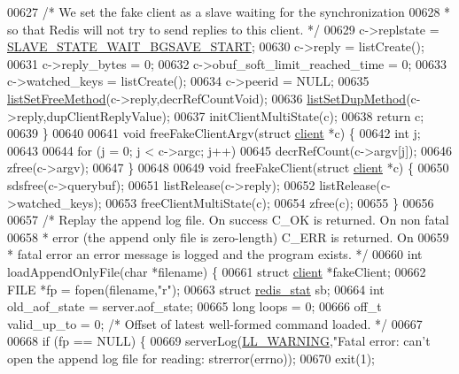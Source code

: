 \begin{DoxyCode}
{{{{{{{{{00627     \textcolor{comment}{/* We set the fake client as a slave waiting for the synchronization}
00628 \textcolor{comment}{     * so that Redis will not try to send replies to this client. */}
00629     c->replstate = \hyperlink{server_8h_a170ee2dd8cfefaf0d112edcc3152f8d7}{SLAVE\_STATE\_WAIT\_BGSAVE\_START};
00630     c->reply = listCreate();
00631     c->reply\_bytes = 0;
00632     c->obuf\_soft\_limit\_reached\_time = 0;
00633     c->watched\_keys = listCreate();
00634     c->peerid = NULL;
00635     \hyperlink{adlist_8h_a648e4a2d20decff3182a72a608b0b8f2}{listSetFreeMethod}(c->reply,decrRefCountVoid);
00636     \hyperlink{adlist_8h_ab575839d09f454c02e06bcec5addb06b}{listSetDupMethod}(c->reply,dupClientReplyValue);
00637     initClientMultiState(c);
00638     \textcolor{keywordflow}{return} c;
00639 \}
00640 
00641 \textcolor{keywordtype}{void} freeFakeClientArgv(\textcolor{keyword}{struct} \hyperlink{structclient}{client} *c) \{
00642     \textcolor{keywordtype}{int} j;
00643 
00644     \textcolor{keywordflow}{for} (j = 0; j < c->argc; j++)
00645         decrRefCount(c->argv[j]);
00646     zfree(c->argv);
00647 \}
00648 
00649 \textcolor{keywordtype}{void} freeFakeClient(\textcolor{keyword}{struct} \hyperlink{structclient}{client} *c) \{
00650     sdsfree(c->querybuf);
00651     listRelease(c->reply);
00652     listRelease(c->watched\_keys);
00653     freeClientMultiState(c);
00654     zfree(c);
00655 \}
00656 
00657 \textcolor{comment}{/* Replay the append log file. On success C\_OK is returned. On non fatal}
00658 \textcolor{comment}{ * error (the append only file is zero-length) C\_ERR is returned. On}
00659 \textcolor{comment}{ * fatal error an error message is logged and the program exists. */}
00660 \textcolor{keywordtype}{int} loadAppendOnlyFile(\textcolor{keywordtype}{char} *filename) \{
00661     \textcolor{keyword}{struct} \hyperlink{structclient}{client} *fakeClient;
00662     FILE *fp = fopen(filename,\textcolor{stringliteral}{"r"});
00663     \textcolor{keyword}{struct} \hyperlink{config_8h_ae18037d20ab1bc7c716ea0bcb506f7af}{redis\_stat} sb;
00664     \textcolor{keywordtype}{int} old\_aof\_state = server.aof\_state;
00665     \textcolor{keywordtype}{long} loops = 0;
00666     off\_t valid\_up\_to = 0; \textcolor{comment}{/* Offset of latest well-formed command loaded. */}
00667 
00668     \textcolor{keywordflow}{if} (fp == NULL) \{
00669         serverLog(\hyperlink{server_8h_a31229b9334bba7d6be2a72970967a14b}{LL\_WARNING},\textcolor{stringliteral}{"Fatal error: can't open the append log file for reading: %
      strerror(errno));
00670         exit(1);
}}}}}}}}}}
\end{DoxyCode}
